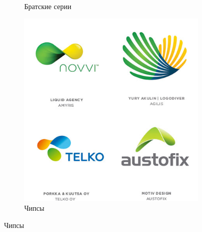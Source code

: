 \begin{figure}[h!]
\begin{subfigure}{.45\textwidth}
    \caption[]{Братские серии}
    \label{fig:logolounge:2012:bratskie-serii}
  \end{subfigure}
  \hfill
  \centering
  \begin{subfigure}{.45\textwidth}
    \centering
    \includegraphics[width=\linewidth]{images/supplement/logolounge/2012/Chipsi}
    \caption[]{Чипсы}
    \label{fig:logolounge:2012:chipsi}
  \end{subfigure}
\end{figure}


